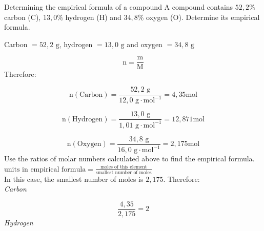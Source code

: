     \noindent
\label{m38712*secfhsst!!!underscore!!!id1029}
      \noindent 
      \begin{wex}{Determining the empirical formula of a compound }{
A compound contains $52,2\%$ carbon ($\text{C}$), $13,0\%$ hydrogen ($\text{H}$) and $34,8\%$ oxygen ($\text{O}$). Determine its empirical formula.      
}
{ %
      \label{m38712*id280928}Carbon $=52,2 \text{ g}$, hydrogen $=13,0 \text{ g}$ and oxygen $=34,8 \text{ g}$ 
      \label{m38712*id280954}\nopagebreak\noindent{}
        
    \begin{equation*}
    \text{n}=\frac{\text{m}}{\text{M}}
      \end{equation*}
      \label{m38712*id280975}Therefore: 
      \label{m38712*id280978}\nopagebreak\noindent{}
        
    \begin{equation*}
    \text{n}\left(\text{Carbon}\right)=\frac{52,2 \text{ g}}{12,0 \text{ g} \cdot \text{mol}^{-1}}=4,35\text{mol}
      \end{equation*}
      \label{m38712*id281042}\nopagebreak\noindent{}
        
    \begin{equation*}
    \text{n}\left(\text{Hydrogen}\right)=\frac{13,0 \text{ g}}{1,01 \text{ g} \cdot \text{mol}^{-1}}=12,871\text{mol}
      \end{equation*}
      \label{m38712*id281111}\nopagebreak\noindent{}
        
    \begin{equation*}
    \text{n}\left(\text{Oxygen}\right)=\frac{34,8 \text{ g}}{16,0 \text{ g} \cdot \text{mol}^{-1}}=2,175\text{mol}
      \end{equation*}
Use the ratios of molar numbers calculated above to find the empirical formula.\\
$\text{units in empirical formula} = \frac{\text{moles of this element}}{\text{smallest number of moles}}$\\
In this case, the smallest number of moles is $2,175$. Therefore:\\ 
      \label{m38712*id281179}
        \textsl{Carbon}
 
      \label{m38712*id281185}\nopagebreak\noindent{}
        
    \begin{equation*}
    \frac{4,35}{2,175}=2
      \end{equation*}
      \label{m38712*id281217}
        \textsl{Hydrogen}
     
}
\end{wex}
